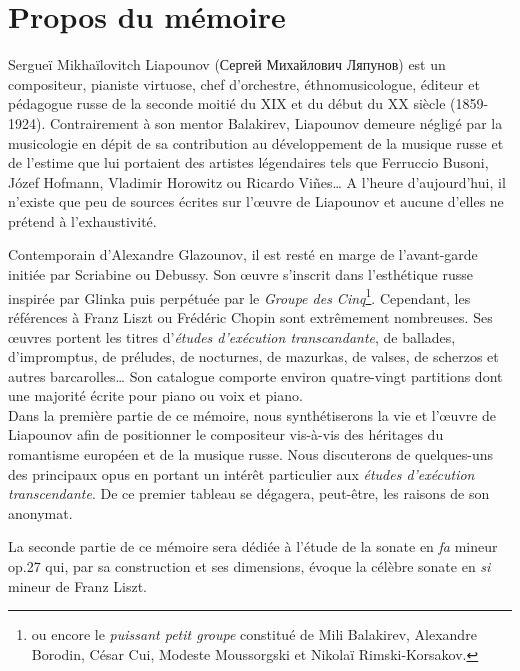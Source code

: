 
\chapter{Propos du mémoire}

Sergueï Mikhaïlovitch Liapounov (\foreignlanguage{russian}{Сергей Михайлович Ляпунов}) est un compositeur, pianiste virtuose, chef d'orchestre, éthnomusicologue, éditeur et pédagogue russe de la seconde moitié du XIX\ieme{} et du début du XX\ieme{} siècle (1859-1924). Contrairement à son mentor Balakirev, Liapounov demeure négligé par la musicologie en dépit de sa contribution au développement de la musique russe et de l'estime que lui portaient des artistes légendaires tels que Ferruccio Busoni, Józef Hofmann, Vladimir Horowitz ou Ricardo Vi\~{n}es\dots{} A l'heure d'aujourd'hui, il n'existe que peu de sources écrites sur l'œuvre de Liapounov et aucune d'elles ne prétend à l'exhaustivité.

Contemporain d'Alexandre Glazounov, il est resté en marge de l'avant-garde initiée par Scriabine ou Debussy. Son œuvre s'inscrit dans l’esthétique russe inspirée par Glinka puis perpétuée par le \emph{Groupe des Cinq}\footnote{ou encore le \emph{puissant petit groupe} constitué de Mili Balakirev, Alexandre Borodin, César Cui, Modeste Moussorgski et Nikolaï Rimski-Korsakov.}. Cependant, les références à Franz Liszt ou Frédéric Chopin sont extrêmement nombreuses. Ses œuvres portent les titres d'\emph{études d'exécution transcandante}, de ballades, d'impromptus, de préludes, de nocturnes, de mazurkas, de valses, de scherzos et autres barcarolles\dots{} Son catalogue comporte environ quatre-vingt partitions dont une majorité écrite pour piano ou voix et piano.\\

Dans la première partie de ce mémoire, nous synthétiserons la vie et l'œuvre de Liapounov afin de positionner le compositeur vis-à-vis des héritages du romantisme européen et de la musique russe. Nous discuterons de quelques-uns des principaux opus en portant un intérêt particulier aux \emph{études d'exécution transcendante}. De ce premier tableau se dégagera, peut-être, les raisons de son anonymat.

La seconde partie de ce mémoire sera dédiée à l'étude de la sonate en \emph{fa} mineur op.27 qui, par sa construction et ses dimensions, évoque la célèbre sonate en \emph{si} mineur de Franz Liszt.

